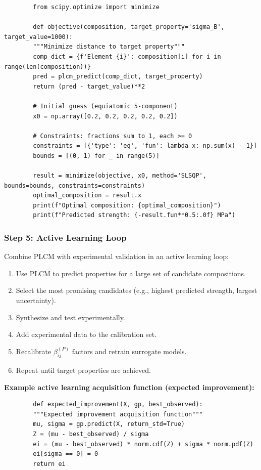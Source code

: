 \documentclass[12pt,a4paper]{article}
\begin{document}
	\begin{verbatim}
		from scipy.optimize import minimize
		
		def objective(composition, target_property='sigma_B', target_value=1000):
		"""Minimize distance to target property"""
		comp_dict = {f'Element_{i}': composition[i] for i in range(len(composition))}
		pred = plcm_predict(comp_dict, target_property)
		return (pred - target_value)**2
		
		# Initial guess (equiatomic 5-component)
		x0 = np.array([0.2, 0.2, 0.2, 0.2, 0.2])
		
		# Constraints: fractions sum to 1, each >= 0
		constraints = [{'type': 'eq', 'fun': lambda x: np.sum(x) - 1}]
		bounds = [(0, 1) for _ in range(5)]
		
		result = minimize(objective, x0, method='SLSQP', bounds=bounds, constraints=constraints)
		optimal_composition = result.x
		print(f"Optimal composition: {optimal_composition}")
		print(f"Predicted strength: {-result.fun**0.5:.0f} MPa")
	\end{verbatim}
	
	\subsubsection{Step 5: Active Learning Loop}
	
	Combine PLCM with experimental validation in an active learning loop:
	
	\begin{enumerate}
		\item Use PLCM to predict properties for a large set of candidate compositions.
		\item Select the most promising candidates (e.g., highest predicted strength, largest uncertainty).
		\item Synthesize and test experimentally.
		\item Add experimental data to the calibration set.
		\item Recalibrate \(\beta_{ij}^{(P)}\) factors and retrain surrogate models.
		\item Repeat until target properties are achieved.
	\end{enumerate}
	
	\textbf{Example active learning acquisition function (expected improvement):}
	
	\begin{verbatim}
		def expected_improvement(X, gp, best_observed):
		"""Expected improvement acquisition function"""
		mu, sigma = gp.predict(X, return_std=True)
		Z = (mu - best_observed) / sigma
		ei = (mu - best_observed) * norm.cdf(Z) + sigma * norm.pdf(Z)
		ei[sigma == 0] = 0
		return ei
	\end{verbatim}
	
\end{document}
